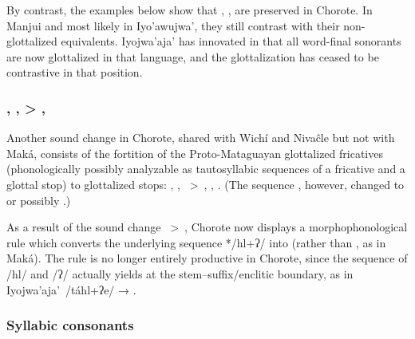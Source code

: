 By contrast, the examples below show that , ,  are preserved in Chorote. In Manjui and most likely in Iyo'awujwa', they still contrast with their non-glottalized equivalents. Iyojwa'aja' has innovated in that all word-final sonorants are now glottalized in that language, and the glottalization has ceased to be contrastive in that position.

\begin{exe}
    \ex \brightness
    \ex \pronominal
    \ex \locustcw
    \ex \thorncutjan
    \ex {}
    \ex \kingvulture
    \ex \meat
\end{exe}

\subsubsection{, ,  > , }\label{ch-glott-fric}

Another sound change in Chorote, shared with Wichí and Nivaĉle but not with Maká, consists of the fortition of the Proto-Mataguayan glottalized fricatives (phonologically possibly analyzable as tautosyllabic sequences of a fricative and a glottal stop) to glottalized stops: , , ~>~, , . (The sequence , however, changed to  or possibly .)

\begin{exe}
    \ex \poor
    \ex \samsam
    \ex \femalebreastits
    \ex \skinits
    \ex \meatits
    \ex \juiceits
    \ex \urinateyou
    \ex \urineits
\end{exe}

As a result of the sound change ~>~, Chorote now displays a morphophonological rule which converts the underlying sequence */hl+ʔ/ into  (rather than , as in Maká). The rule is no longer entirely productive in Chorote, since the sequence of /hl/ and /ʔ/ actually yields  at the stem--suffix/enclitic boundary, as in Iyojwa'aja'~/táhl+ʔe/ → .

\subsubsection{Syllabic consonants}\label{ch-syll-c}

